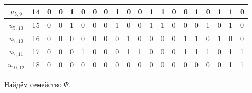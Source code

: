 \documentclass[12pt, a4paper] {ncc}
\begin{document}
{\begin{tabularx}{\textwidth}{|c| c|X X X X X X X X X X X X X X X X X X}
$u_{5,9}$   &14  & 0 & 0 & 1  & 0  & 0  & 0 & 1  & 0  & 0  & 1  & 1  & 0  & 0  & 1  & 0  & 1  & 1   & 0 \\ \hline
$u_{5,10}$  &15  & 0 & 0 & 1  & 0  & 0  & 0 & 1  & 0  & 0  & 1  & 1  & 0  & 0  & 0  & 1  & 0  & 1   & 0 \\ \hline
$u_{7,10}$  &16  & 0 & 0 & 0  & 0  & 0  & 0 & 0  & 1  & 0  & 0  & 0  & 0  & 1  & 1  & 0  & 1  & 0   & 0 \\ \hline
$u_{7,11}$  &17  & 0 & 0 & 0  & 1  & 0  & 0 & 0  & 1  & 1  & 0  & 0  & 0  & 1  & 1  & 1  & 0  & 1   & 1 \\ \hline
$u_{10,12}$ & 18 & 0 & 0 & 0  & 0  & 0  & 0 & 0  & 0  & 0  & 0  & 0  & 0  & 0  & 0  & 0  & 0  & 1   & 1 \\ \hline
\end{tabularx}}

Найдём семейство $\Psi$.
\end{document}
